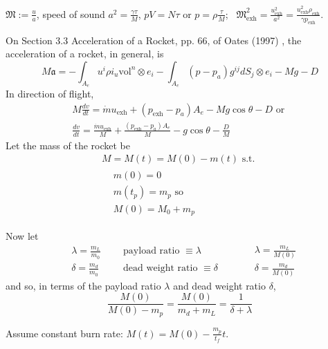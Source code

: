 \documentclass[10pt]{amsart}
\begin{document}
\begin{multicols*}{2}
$\mathfrak{M} := \frac{u}{a}$, speed of sound $a^2 = \frac{\gamma \tau}{M}$, $pV = N\tau$ or $p=\rho \frac{\tau}{M}$; \quad \, $\mathfrak{M}^2_{\text{exh}} = \frac{u^2_{\text{exh}}}{a^2} = \frac{u^2_{\text{exh}} \rho_{\text{exh}} }{ \gamma p_{\text{exh}}}$. 

On Section 3.3 Acceleration of a Rocket, pp. 66, of Oates (1997) \cite{GOates1997}, the acceleration of a rocket, in general, is 
\[
M \mathfrak{a} = -\int_{A_e} u^i \rho i_u \text{vol}^n \otimes e_i - \int_{A_e} (p-p_a)g^{ij} dS_j \otimes e_i - Mg - D
\]
In direction of flight,
\[
\begin{gathered}
  M\frac{dv}{dt} = \dot{m} u_{\text{exh}} + (p_{\text{exh}} - p_a)A_e - Mg \cos{\theta} - D \text{ or } \\
  \frac{dv}{dt} = \frac{ \dot{m} u_{\text{exh}} }{ M } + \frac{ (p_{\text{exh}} - p_a)A_e}{ M} - g\cos{\theta} - \frac{D}{M}
\end{gathered}
\]
Let the mass of the rocket be 
\[
\begin{gathered}
  M= M(t) = M(0) - m(t) \text{ s.t. } \\
  \begin{aligned}
    & m(0) = 0 \\
    & m(t_p) = m_p \text{ so }  \\
    & M(0) = M_0 + m_p 
\end{aligned}
\end{gathered}
\]

Now let 
\[
\begin{aligned}
  & \lambda = \frac{m_L}{m_0}  \quad \, & \text{ payload ratio } \equiv \lambda \\  
  & \delta = \frac{m_d}{m_0} \quad \, & \text{ dead weight ratio } \equiv \delta   
\end{aligned} \quad \quad \, \begin{aligned}
  & \lambda = \frac{m_L}{M(0)} \\ 
  &  \delta = \frac{m_d}{M(0) }
\end{aligned}
\]
and so, in terms of the payload ratio $\lambda$ and dead weight ratio $\delta$,
\[
\frac{M(0)}{M(0) - m_p } = \frac{M(0)}{m_d + m_L } = \frac{1}{\delta + \lambda}
\]

Assume constant burn rate: $M(t) = M(0) - \frac{m_p}{t_f} t$.  


\end{multicols*}
\end{document}
